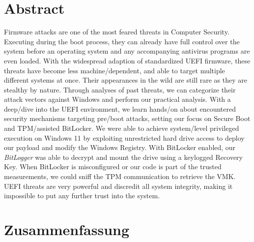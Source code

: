 

\chapter*{Abstract}
\label{sec:abstract}
\thispagestyle{empty}

Firmware attacks are one of the most feared threats in Computer Security.
Executing during the boot process, they can already have full control over the system before an operating system and any accompanying antivirus programs are even loaded.
With the widespread adaption of standardized \acf{UEFI} firmware, these threats have become less machine\-/dependent, and able to target multiple different systems at once.
Their appearances in the wild are still rare as they are stealthy by nature.
Through analyses of past threats, we can categorize their attack vectors against Windows and perform our practical analysis.
With a deep\-/dive into the \ac{UEFI} environment, we learn hands\-/on about encountered security mechanisms targeting pre\-/boot attacks, setting our focus on Secure Boot and \acf{TPM}\-/assisted BitLocker.
We were able to achieve system\-/level privileged execution on Windows 11 by exploiting unrestricted hard drive access to deploy our payload and modify the Windows Registry.
With BitLocker enabled, our \emph{BitLogger} was able to decrypt and mount the drive using a keylogged Recovery Key.
When BitLocker is misconfigured or our code is part of the trusted measurements, we could sniff the \acs{TPM} communication to retrieve the \acs{VMK}.
\acs{UEFI} threats are very powerful and discredit all system integrity, making it impossible to put any further trust into the system.

\acresetall

\chapter*{Zusammenfassung}
\thispagestyle{empty}
\label{sec:zusammenfassung}

